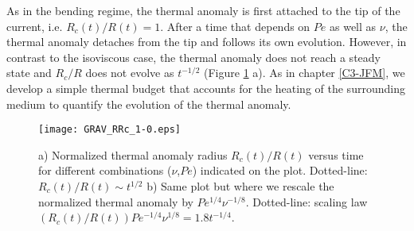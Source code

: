 As in the bending regime, the thermal anomaly is first attached to the
tip of the current, i.e. $R_c(t)/R(t)=1$. After a time that depends on
$Pe$ as well  as $\nu$, the thermal anomaly detaches  from the tip and
follows  its own  evolution. However,  in contrast  to the  isoviscous
case, the  thermal anomaly does not  reach a steady state  and $R_c/R$
does not evolve as $t^{-1/2}$ (Figure \ref{C4-GRAV_RRc_RArrhenius_1-0}
a). As  in chapter  \ref{C3-JFM}, we develop  a simple  thermal budget
that accounts  for the heating  of the surrounding medium  to quantify
the evolution of the thermal anomaly.
\begin{figure}[h!]
  \begin{center}
    \graphicspath{ {/Users/thorey/Documents/These/Projet/Refroidissement/Skin_Model/Figure/Figure_Heating/} }
    \texttt{[image: GRAV\_RRc\_1-0.eps]}
    \caption{a) Normalized thermal anomaly radius $R_c(t)/R(t)$ versus
      time for  different combinations  ($\nu$,$Pe$) indicated  on the
      plot.  Dotted-line:  $R_c(t)/R(t)\sim t^{1/2}$ b) Same  plot but
      where   we   rescale   the   normalized   thermal   anomaly   by
      $Pe^{1/4}\nu^{-1/8}$.        Dotted-line:      scaling       law
      $(R_c(t)/R(t))Pe^{-1/4}\nu^{1/8}= 1.8t^{-1/4}$.}
    \label{C4-GRAV_RRc_RArrhenius_1-0}
  \end{center}
\end{figure}

